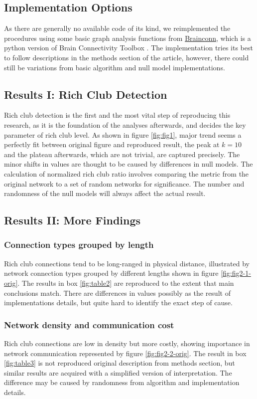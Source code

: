 \documentclass{article}
\begin{document}
\subsection*{Implementation Options}
As there are generally no available code of its kind, we reimplemented the procedures using some basic graph analysis functions from \href{https://github.com/FIU-Neuro/brainconn}{Brainconn}, which is a python version of Brain Connectivity Toolbox \cite{rubinov2010complex}. The implementation tries its best to follow descriptions in the methods section of the article, however, there could still be variations from basic algorithm and null model implementations.

\subsection*{Results I: Rich Club Detection}
Rich club detection is the first and the most vital step of reproducing this research, as it is the foundation of the analyses afterwards, and decides the key parameter of rich club level. As shown in figure \ref{fig:fig1}, major trend seems a perfectly fit between original figure and reproduced result, the peak at $k=10$ and the plateau afterwards, which are not trivial, are captured precisely. The minor shifts in values are thought to be caused by differences in null models. The calculation of normalized rich club ratio involves comparing the metric from the original network to a set of random networks for significance. The number and randomness of the null models will always affect the actual result.

\subsection*{Results II: More Findings}
\subsubsection*{Connection types grouped by length}
Rich club connections tend to be long-ranged in physical distance, illustrated by network connection types grouped by different lengths shown in figure \ref{fig:fig2-1-orig}. The results in box \ref{fig:table2} are reproduced to the extent that main conclusions match. There are differences in values possibly as the result of implementations details, but quite hard to identify the exact step of cause.

\subsubsection*{Network density and communication cost}
Rich club connections are low in density but more costly, showing importance in network communication represented by figure \ref{fig:fig2-2-orig}.
The result in box \ref{fig:table3} is not reproduced original description from methods section, but similar results are acquired with a simplified version of interpretation. The difference may be caused by randomness from algorithm and implementation details.
\end{document}
